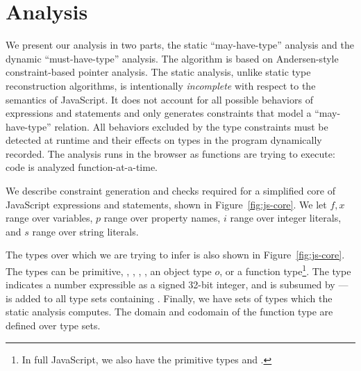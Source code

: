 \section{Analysis}

We present our analysis in two parts, the static ``may-have-type'' analysis
and the dynamic ``must-have-type'' analysis. The algorithm is based on
Andersen-style constraint-based pointer analysis. The static analysis, unlike
static type reconstruction algorithms, is intentionally \textit{incomplete}
with respect to the semantics of JavaScript. It does not account for all
possible behaviors of expressions and statements and only generates
constraints that model a ``may-have-type'' relation. All behaviors excluded by
the type constraints must be detected at runtime and their effects on types in
the program dynamically recorded. The analysis runs in the browser as functions
are trying to execute: code is analyzed function-at-a-time.

%
%
%
%
%
%

We describe constraint generation and checks required for a simplified core of
JavaScript expressions and statements, shown in Figure~\ref{fig:js-core}. We
let $f,x$ range over variables, $p$ range over property names, $i$ range over
integer literals, and $s$ range over string literals.

The types over which we are trying to infer is also shown in
Figure~\ref{fig:js-core}. The types can be primitive, ,
, , , an object type $o$, or a function
type\footnote{In full JavaScript, we also have the primitive types 
  and .}. The  type indicates a number expressible as a
signed 32-bit integer, and is subsumed by  ---  is
added to all type sets containing . Finally, we have sets of
types which the static analysis computes. The domain and codomain of the
function type are defined over type sets.


